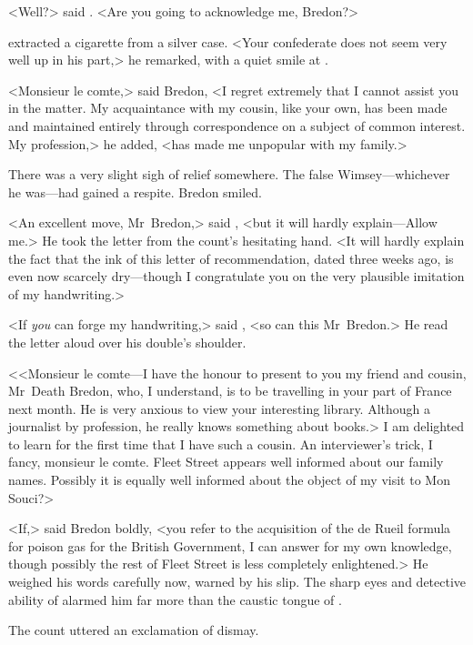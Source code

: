 <Well?> said . <Are you going to acknowledge me, Bredon?>

 extracted a cigarette from a silver case. <Your confederate does not seem very well up in his part,> he remarked, with a quiet smile at .

<Monsieur le comte,> said Bredon, <I regret extremely that I cannot assist you in the matter. My acquaintance with my cousin, like your own, has been made and maintained entirely through correspondence on a subject of common interest. My profession,> he added, <has made me unpopular with my family.>

There was a very slight sigh of relief somewhere. The false Wimsey—whichever he was—had gained a respite. Bredon smiled.

<An excellent move, Mr~Bredon,> said , <but it will hardly explain—Allow me.> He took the letter from the count's hesitating hand. <It will hardly explain the fact that the ink of this letter of recommendation, dated three weeks ago, is even now scarcely dry—though I congratulate you on the very plausible imitation of my handwriting.>

<If \textit{you} can forge my handwriting,> said , <so can this Mr~Bredon.> He read the letter aloud over his double's shoulder.

<<Monsieur le comte—I have the honour to present to you my friend and cousin, Mr~Death Bredon, who, I understand, is to be travelling in your part of France next month. He is very anxious to view your interesting library. Although a journalist by profession, he really knows something about books.> I am delighted to learn for the first time that I have such a cousin. An interviewer's trick, I fancy, monsieur le comte. Fleet Street appears well informed about our family names. Possibly it is equally well informed about the object of my visit to Mon Souci?>

<If,> said Bredon boldly, <you refer to the acquisition of the de Rueil formula for poison gas for the British Government, I can answer for my own knowledge, though possibly the rest of Fleet Street is less completely enlightened.> He weighed his words carefully now, warned by his slip. The sharp eyes and detective ability of  alarmed him far more than the caustic tongue of .

The count uttered an exclamation of dismay.


